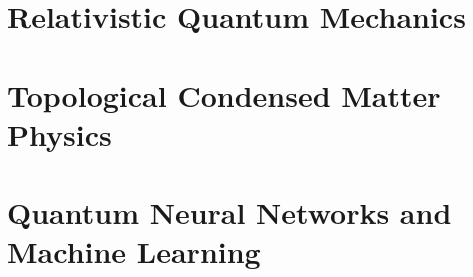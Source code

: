 \documentclass[11pt,a4paper,oneside,openany]{book}
\numberwithin{equation}{section}
\begin{document}
\chapter{Relativistic Quantum Mechanics}\label{ch:relativistic-qm}




\chapter{Topological Condensed Matter Physics}\label{ch:topological-matter}






\chapter{Quantum Neural Networks and Machine Learning}\label{ch:qnn-ml}





\cleardoublepage
{}


\end{document}
